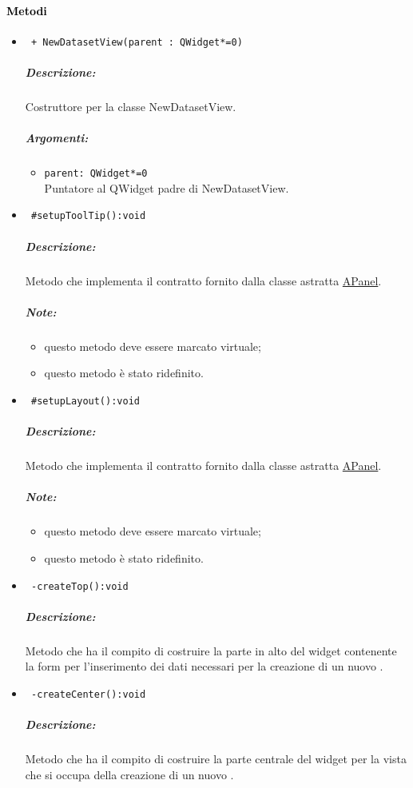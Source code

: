 \paragraph{\textcolor{black}{Metodi\\}}
\begin{itemize}
\item\color{blue}\verb! + NewDatasetView(parent : QWidget*=0)!
\color{black}
\subparagraph{Descrizione:}Costruttore per la classe NewDatasetView.
\subparagraph{Argomenti:}
\begin{itemize}
\item \color{RoyalPurple}\verb!parent: QWidget*=0 ! \\ Puntatore al QWidget padre di NewDatasetView.
\end{itemize}
 
\item\color{blue}\verb! #setupToolTip():void!

\color{black}
\subparagraph{Descrizione:} Metodo che implementa il contratto fornito dalla classe astratta \hyperref[speAPanel]{APanel}.
 \subparagraph{Note:}
 \begin{itemize}
 \item questo metodo deve essere marcato virtuale;
 \item questo metodo è stato ridefinito.
 \end{itemize} 
 
\item\color{blue}\verb! #setupLayout():void!
\color{black} 
\subparagraph{Descrizione:}Metodo che implementa il contratto fornito dalla classe astratta \hyperref[speAPanel]{APanel}.
\subparagraph{Note:}
\begin{itemize}
\item questo metodo deve essere marcato virtuale;
\item questo metodo è stato ridefinito.
\end{itemize}
  
\item\color{blue}\verb! -createTop():void!
\color{black}
\subparagraph{Descrizione:} Metodo che ha il compito di costruire la parte in alto del widget contenente la form per l'inserimento dei dati necessari per la creazione di un nuovo \dataset{}.
  
\item\color{blue}\verb! -createCenter():void!
\color{black} 
\subparagraph{Descrizione:}Metodo che ha il compito di costruire la parte centrale del widget per la vista che si occupa della  creazione di un nuovo \dataset{}.
  

\end{itemize}
